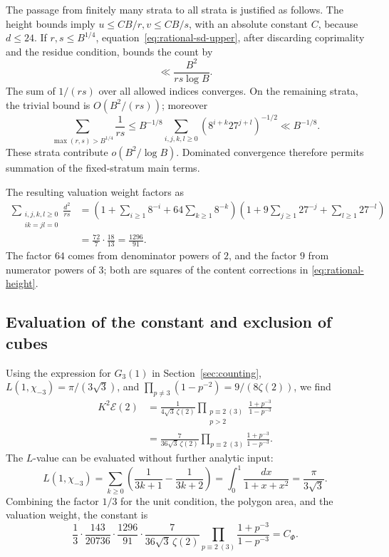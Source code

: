 The passage from finitely many strata to all strata is justified as
follows.  The height bounds imply \(u\le CB/r,v\le CB/s\), with an
absolute constant \(C\), because \(d\le24\).  If
\(r,s\le B^{1/4}\), equation~\eqref{eq:rational-sd-upper}, after
discarding coprimality and the residue condition, bounds the count by
\[
 \ll\frac{B^2}{rs\log B}.
\]
The sum of \(1/(rs)\) over all allowed indices converges.  On the
remaining strata, the trivial bound is \(O(B^2/(rs))\); moreover
\[
 \sum_{\max(r,s)>B^{1/4}}\frac1{rs}
 \le B^{-1/8}\sum_{i,j,k,l\ge0}(8^{i+k}27^{j+l})^{-1/2}
 \ll B^{-1/8}.
\]
These strata contribute \(o(B^2/\log B)\).  Dominated convergence
therefore permits summation of the fixed-stratum main terms.

The resulting valuation weight factors as
\begin{align*}
 \sum_{\substack{i,j,k,l\ge0\\ik=jl=0}}\frac{d^2}{rs}
 &=\left(1+\sum_{i\ge1}8^{-i}
             +64\sum_{k\ge1}8^{-k}\right)
   \left(1+9\sum_{j\ge1}27^{-j}
             +\sum_{l\ge1}27^{-l}\right)\\
 &=\frac{72}{7}\cdot\frac{18}{13}
   =\frac{1296}{91}.
\end{align*}
The factor \(64\) comes from denominator powers of \(2\), and the
factor \(9\) from numerator powers of \(3\); both are squares of
the content corrections in \eqref{eq:rational-height}.

\subsection{Evaluation of the constant and exclusion of cubes}

Using the expression for \(G_3(1)\) in Section~\ref{sec:counting},
\(L(1,\chi_{-3})=\pi/(3\sqrt3)\), and
\(\prod_{p\ne3}(1-p^{-2})=9/(8\zeta(2))\), we find
\begin{align*}
 K^2\mathcal E(2)
 &=\frac1{4\sqrt3\,\zeta(2)}
   \prod_{\substack{p\equiv2\ (3)\\p>2}}
          \frac{1+p^{-3}}{1-p^{-3}}\\
 &=\frac7{36\sqrt3\,\zeta(2)}
   \prod_{p\equiv2\ (3)}\frac{1+p^{-3}}{1-p^{-3}}.
\end{align*}
The \(L\)-value can be evaluated without further analytic input:
\[
 L(1,\chi_{-3})=
 \sum_{k\ge0}\left(\frac1{3k+1}-\frac1{3k+2}\right)
 =\int_0^1\frac{dx}{1+x+x^2}
 =\frac{\pi}{3\sqrt3}.
\]
Combining the factor \(1/3\) for the unit condition, the polygon area,
and the valuation weight, the constant is
\[
 \frac13\cdot\frac{143}{20736}\cdot\frac{1296}{91}
 \cdot\frac7{36\sqrt3\,\zeta(2)}
 \prod_{p\equiv2\ (3)}\frac{1+p^{-3}}{1-p^{-3}}
 =C_\Phi.
\]


